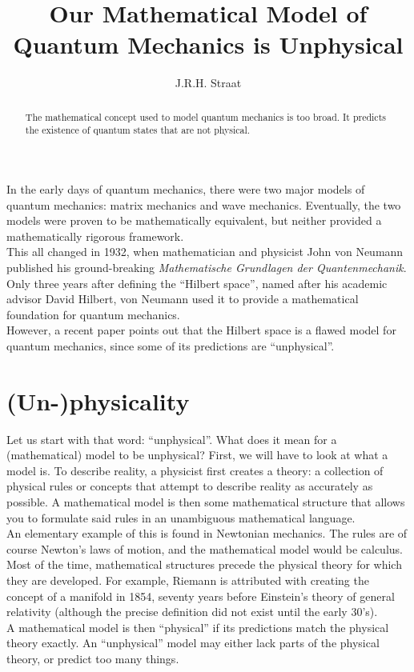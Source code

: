 \documentclass[12pt]{article}
\title{Our Mathematical Model of Quantum Mechanics is Unphysical}      %
\author{J.R.H. Straat}
\date{}
\begin{document}
\maketitle
%
\begin{abstract}
	The mathematical concept used to model quantum mechanics is too broad. It predicts the existence of quantum states that are not physical.
\end{abstract}
%
\begin{multicols}{2}
    In the early days of quantum mechanics, there were two major models of quantum mechanics: matrix mechanics and wave mechanics. Eventually, the two models were proven to be mathematically equivalent, but neither provided a mathematically rigorous framework.\\
    This all changed in 1932, when mathematician and physicist John von Neumann published his ground-breaking \textit{Mathematische Grundlagen der Quantenmechanik}\cite{von_neumann_mathematische_1996}. Only three years after defining the ``Hilbert space'', named after his academic advisor David Hilbert, von Neumann used it to provide a mathematical foundation for quantum mechanics.\\
    However, a recent paper\cite{carcassi_unphysicality_2023} points out that the Hilbert space is a flawed model for quantum mechanics, since some of its predictions are ``unphysical''.
    \section*{(Un-)physicality}
    Let us start with that word: ``unphysical''. What does it mean for a (mathematical) model to be unphysical? First, we will have to look at what a model is. To describe reality, a physicist first creates a theory: a collection of physical rules or concepts that attempt to describe reality as accurately as possible. A mathematical model is then some mathematical structure that allows you to formulate said rules in an unambiguous mathematical language.\\
    An elementary example of this is found in Newtonian mechanics. The rules are of course Newton's laws of motion, and the mathematical model would be calculus.\\
    Most of the time, mathematical structures precede the physical theory for which they are developed. For example, Riemann is attributed with creating the concept of a manifold in 1854, seventy years before Einstein's theory of general relativity (although the precise definition did not exist until the early 30's).\\    %
    A mathematical model is then ``physical'' if its predictions match the physical theory exactly. An ``unphysical'' model may either lack parts of the physical theory, or predict too many things.

\end{multicols}
\end{document}

